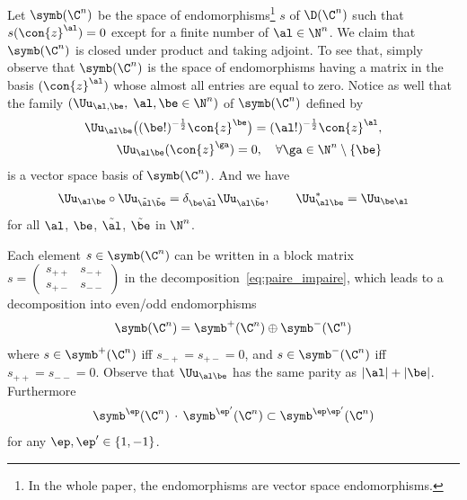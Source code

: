 Let $\symb (\C^n)$ be the space of endomorphisms\footnote{
In the whole paper, the endomorphisms are vector space endomorphisms.
}
$s $ of $\D(\C^n)$ such that $s (\con{z}^\al) = 0$ except for a finite number of $\al \in
\N^{n}$. We claim that $\symb (\C^n)$ is closed under product and taking adjoint. To see that, simply observe that $\symb (\C^n)$ is the space of endomorphisms having a matrix in the basis $(\con{z}^\al)$ whose almost all entries are equal to zero. Notice as well that the family $(\Uu_{\al, \be}, \;
\al, \be \in \N^n)$ of $\symb (\C^n)$ defined by
\begin{gather}\label{eq:def_Ualphabeta}
\begin{split}
\Uu_{\al \be } \bigl((\be !)^{-\frac{1}{2}} \con{z}^\be \bigr) = (\al !)^{-\frac{1}{2}}
\con{z}^{\al}, \\ 
\Uu_{\al \be} (\con{z}^{\ga}) = 0, \quad \forall \ga \in \N^n
\setminus \{ \be \}
\end{split}
\end{gather}
is a vector space basis of $\symb (\C^{n})$. And we have
\begin{gather}\label{eq:rel_U}
\Uu_{\al \be} \circ \Uu_{\tilde \al \tilde \be } = \delta_{\be \tilde{\al}}
\Uu_{\al \tilde \be}, \qquad \Uu_{\al \be}^* =
\Uu_{\be \al}
\end{gather}
for all $\al$, $\be$, $\tilde \al$, $\tilde \be$ in $\N^n$.

Each element $s \in \symb (\C^n)$ can be written in a block matrix $s =
(\begin{smallmatrix} s_{++} & s_{-+}
\\ s _{+-} & s_{--}
\end{smallmatrix})$ in the decomposition~\eqref{eq:paire_impaire}, which leads to a decomposition into even/odd endomorphisms
\begin{gather}\label{eq:symb+_-}
\symb (\C^n) = \symb^{+} (\C^n) \oplus \symb^{-} (\C^n)
\end{gather}
where $s \in \symb^{+} (\C^n)$ iff $s_{-+} = s_{+-} =0$, and $s \in
\symb^{-} (\C^n)$ iff $s_{++} = s_{--} = 0 $. Observe that $\Uu_{\al\be}$ has the same parity as $|\al | + | \be|$. Furthermore
\begin{gather}
\symb^{\ep} (\C^n)\, \cdot \, \symb^{\ep'} (\C^n) \subset
\symb^{\ep \ep'} (\C^n)
\end{gather}
for any $\ep, \ep' \in \{ 1, -1 \}$.


